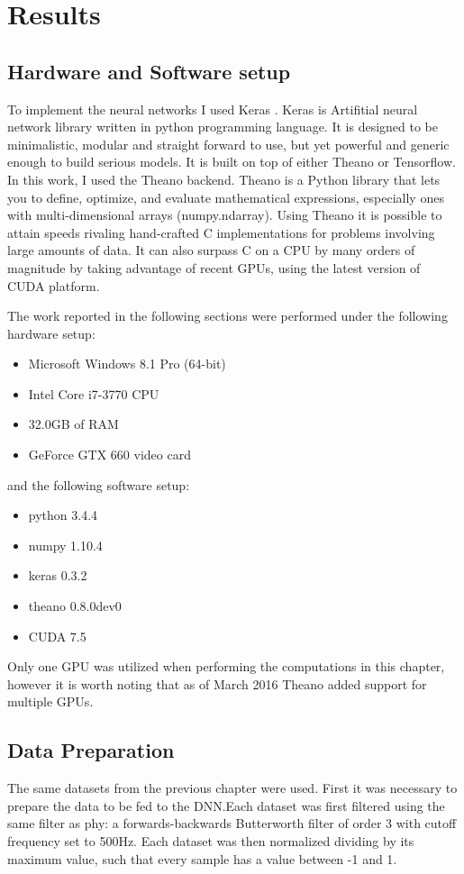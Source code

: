 \section{Results}
\label{sec:DL-results}

\subsection{Hardware and Software setup}
\label{subsec:hardware-software}
To implement the neural networks I used Keras \cite{chollet2015keras}. Keras is Artifitial neural network library written in python programming language. It is designed to be minimalistic, modular and straight forward to use, but yet powerful and generic enough to build serious models. It is built on top of either Theano or Tensorflow. In this work, I used the Theano backend. Theano is a Python library that lets you to define, optimize, and evaluate mathematical expressions, especially ones with multi-dimensional arrays (numpy.ndarray). Using Theano it is possible to attain speeds rivaling hand-crafted C implementations for problems involving large amounts of data. It can also surpass C on a CPU by many orders of magnitude by taking advantage of recent GPUs, using the latest version of CUDA platform. \cite{theano2010} \cite{theano2012}

The work reported in the following sections were performed under the following hardware setup:
\begin{itemize}
\item Microsoft Windows 8.1 Pro (64-bit)
\item Intel Core i7-3770 CPU
\item 32.0GB of RAM
\item GeForce GTX 660 video card
\end{itemize}

\noindent 
and the following software setup:
\begin{itemize}
\item python 3.4.4
\item numpy 1.10.4
\item keras 0.3.2
\item theano 0.8.0dev0
\item CUDA 7.5
\end{itemize}

Only one GPU was utilized when performing the computations in this chapter, however it is worth noting that as of March 2016 Theano added support for multiple GPUs.

\subsection{Data Preparation}
\label{subsec:data-preparation}
The same datasets from the previous chapter were used. First it was necessary to prepare the data to be fed to the DNN.Each dataset was first filtered using the same filter as phy: a forwards-backwards Butterworth filter of order 3 with cutoff frequency set to 500Hz. Each dataset was then normalized dividing by its maximum value, such that every sample has a value between -1 and 1.

